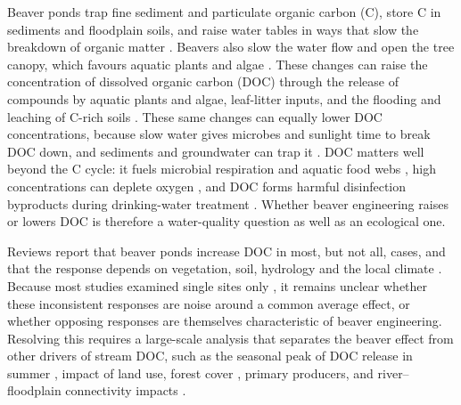 \documentclass[pdflatex,sn-nature]{sn-jnl}   %
\begin{document}
Beaver ponds trap fine sediment and particulate organic carbon (C), store C in sediments and floodplain soils, and raise water tables in ways that slow the breakdown of organic matter \cite{wohl2012,wohl2013,johnston2014,laurel2019}. Beavers also slow the water flow and open the tree canopy, which favours aquatic plants and algae \cite{johnston2017,nummi2018,ray2001}. These changes can raise the concentration of dissolved organic carbon (DOC) through the release of compounds by aquatic plants and algae, leaf-litter inputs, and the flooding and leaching of C-rich soils \cite{bedzki2010,ciuldiene2020,johnston2017}. These same changes can equally lower DOC concentrations, because slow water gives microbes and sunlight time to break DOC down, and sediments and groundwater can trap it \cite{nummi2018,ledford2023}. DOC matters well beyond the C cycle: it fuels microbial respiration and aquatic food webs \cite{meyer1988,battin2023}, high concentrations can deplete oxygen \cite{stanley2012}, and DOC forms harmful disinfection byproducts during drinking-water treatment \cite{leonard2022}. Whether beaver engineering raises or lowers DOC is therefore a water-quality question as well as an ecological one.

Reviews report that beaver ponds increase DOC in most, but not all, cases, and that the response depends on vegetation, soil, hydrology and the local climate \cite{larsen2021,grudzinski2022}. Because most studies examined single sites only \cite{bedzki2010,ciuldiene2020,ledford2023}, it remains unclear whether these inconsistent responses are noise around a common average effect, or whether opposing responses are themselves characteristic of beaver engineering. Resolving this requires a large-scale analysis that separates the beaver effect from other drivers of stream DOC, such as the seasonal peak of DOC release in summer \cite{mulholland1997}, impact of land use, forest cover \cite{laudon2011,lemaire2022}, primary producers, and river--floodplain connectivity impacts \cite{wilson2008,allan2021}.
\end{document}
